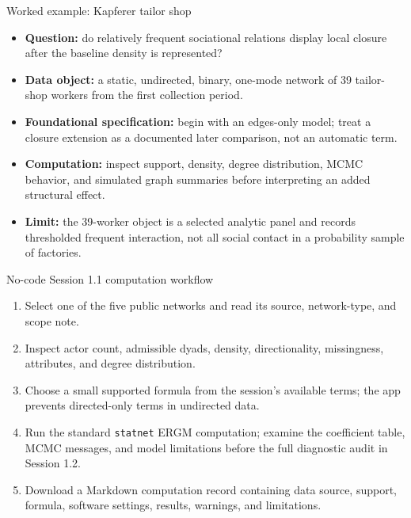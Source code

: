 \documentclass[aspectratio=169,11pt]{beamer}
\newcommand{\term}[1]{\textbf{\color{nupurple}#1}}
\begin{document}
\begin{frame}{Worked example: Kapferer tailor shop}
\begin{itemize}
\item \term{Question:} do relatively frequent sociational relations display local closure after the baseline density is represented?
\item \term{Data object:} a static, undirected, binary, one-mode network of 39 tailor-shop workers from the first collection period.
\item \term{Foundational specification:} begin with an edges-only model; treat a closure extension as a documented later comparison, not an automatic term.
\item \term{Computation:} inspect support, density, degree distribution, MCMC behavior, and simulated graph summaries before interpreting an added structural effect.
\item \term{Limit:} the 39-worker object is a selected analytic panel and records thresholded frequent interaction, not all social contact in a probability sample of factories.
\end{itemize}
\end{frame}

\begin{frame}{No-code Session 1.1 computation workflow}
\begin{enumerate}
\item Select one of the five public networks and read its source, network-type, and scope note.
\item Inspect actor count, admissible dyads, density, directionality, missingness, attributes, and degree distribution.
\item Choose a small supported formula from the session's available terms; the app prevents directed-only terms in undirected data.
\item Run the standard \texttt{statnet} ERGM computation; examine the coefficient table, MCMC messages, and model limitations before the full diagnostic audit in Session 1.2.
\item Download a Markdown computation record containing data source, support, formula, software settings, results, warnings, and limitations.
\end{enumerate}
\end{frame}
\end{document}
